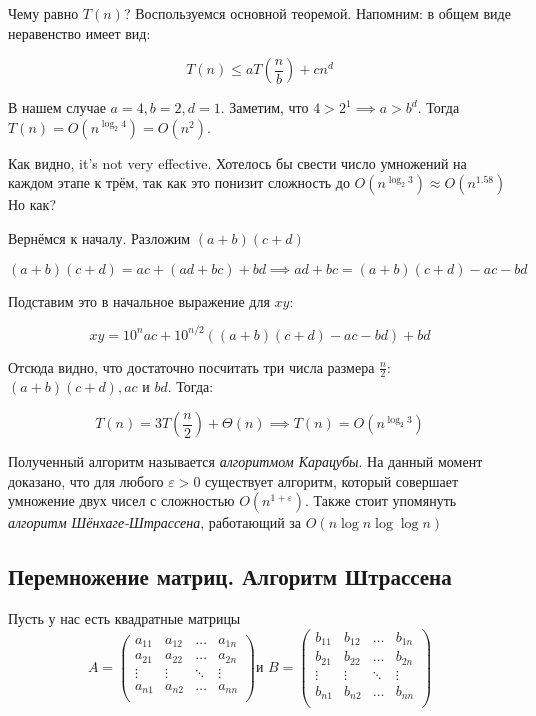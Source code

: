\documentclass[a4paper,12pt]{article}
\begin{document}
Чему равно $T(n)$? Воспользуемся основной теоремой. Напомним: в общем виде неравенство
имеет вид:

\[T(n) \leqslant aT\left( \frac{n}{b} \right) + cn^d\]

В нашем случае $a = 4, b = 2, d = 1$. Заметим, что $4 > 2^1 \implies a > b^d$. Тогда $T(n) = O(n^{\log_2 4}) = O(n^2)$.

Как видно, it’s not very effective. Хотелось бы свести число умножений на каждом этапе к
трём, так как это понизит сложность до $O(n^{\log_2 3}) \approx O(n^{1.58})$Но как?

Вернёмся к началу. Разложим $(a + b)(c + d)$

\[(a+b)(c+d) = ac+(ad+bc) + bd \implies ad + bc = (a + b)(c + d) - ac - bd\]

Подставим это в начальное выражение для $xy$:

\[xy = 10^{n}ac + 10^{n/2}((a + b)(c + d) - ac - bd)+bd\]

Отсюда видно, что достаточно посчитать три числа размера $\frac{n}{2}$: $(a + b)(c + d), ac$ и $bd$. Тогда:

\[T(n) = 3T\left( \frac{n}{2} \right) + \Theta(n) \implies T(n) = O(n^{\log_2 3})\]

Полученный алгоритм называется \emph{алгоритмом Карацубы}.
На данный момент доказано, что для любого $\varepsilon > 0$ существует алгоритм, который совершает умножение двух чисел с сложностью $O(n^{1 + \varepsilon})$. Также стоит упомянуть \emph{алгоритм Шёнхаге-Штрассена}, работающий за $O(n \log n \log \log n)$

\subsection{Перемножение матриц. Алгоритм Штрассена}

Пусть у нас есть квадратные матрицы
\[A = \begin{pmatrix}
a_{11} & a_{12} & \ldots & a_{1n} \\
a_{21} & a_{22} & \ldots & a_{2n} \\
\vdots & \vdots & \ddots & \vdots \\
a_{n1} & a_{n2} & \ldots & a_{nn} \\
\end{pmatrix}
\text{и } 
B = \begin{pmatrix}
b_{11} & b_{12} & \ldots & b_{1n} \\
b_{21} & b_{22} & \ldots & b_{2n} \\
\vdots & \vdots & \ddots & \vdots \\
b_{n1} & b_{n2} & \ldots & b_{nn} \\
\end{pmatrix}\]
\end{document}
